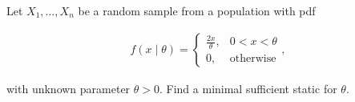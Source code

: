 
\begin{exercise}

Let $X_1, \dots, X_n$ be a random sample from a population with pdf

\begin{align*}
    f(x \mid \theta)
    =
    \begin{cases}
        \frac{2 x}{\theta}, & 0 < x < \theta \\
        0,                  & \text{otherwise}
    \end{cases},
\end{align*}

with unknown parameter $\theta > 0$.
Find a minimal sufficient static for $\theta$.

\end{exercise}


\begin{solution}

\phantom{}

\end{solution}

